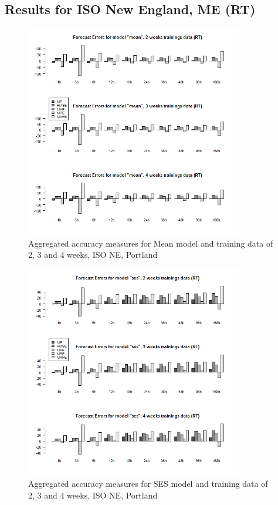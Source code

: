 \FloatBarrier
\subsection{Results for ISO New England, ME (RT)}




\begin{figure}[!ht]
	\centering
		\includegraphics[width=0.85\textwidth]{figures/appendix_forecast_results/rt_sim_4_x_1w_1w_mean.png}
	\caption{Aggregated accuracy measures for Mean model and training data of 2, 3 and 4 weeks, ISO NE, Portland}
	\label{fig:app_rt_sim_4_x_1w_1w_mean}
\end{figure}



\begin{figure}[!ht]
	\centering
	\vspace*{-1.2in}
		\includegraphics[width=0.85\textwidth]{figures/appendix_forecast_results/rt_sim_4_x_1w_1w_ses.png}
	\caption{Aggregated accuracy measures for SES model and training data of 2, 3 and 4 weeks, ISO NE, Portland}
	\label{fig:app_rt_sim_4_x_1w_1w_ses}
\end{figure}

